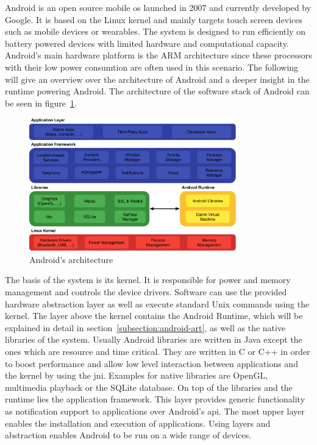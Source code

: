 Android is an open source mobile \gls{os} launched in 2007 and currently developed by Google.
It is based on the Linux kernel and mainly targets touch screen devices such as mobile devices or wearables.
The system is designed to run efficiently on battery powered devices with limited hardware and computational capacity.
Android's main hardware platform is the ARM architecture since these processors with their low power consumtion are often used in this scenario.
The following will give an overview over the architecture of Android and a deeper insight in the runtime powering Android.
The architecture of the software stack of Android can be seen in figure~\ref{fig:androidArchitecture}.
\newline

\begin{figure}[h]
    \centering
    \includegraphics[width=0.8\textwidth]{data/stack.png}
    \caption{Android's architecture \cite{androidStack}}
    \label{fig:androidArchitecture}
\end{figure}

The basis of the system is its kernel.
It is responsible for power and memory management and controls the device drivers.
Software can use the provided hardware abstraction layer as well as execute standard Unix commands using the kernel.
\newline
The layer above the kernel contains the Android Runtime, which will be explained in detail in section~\ref{subsection:android-art}, as well as the native libraries of the system.
Usually Android libraries are written in Java except the ones which are resource and time critical.
They are written in C or C++ in order to boost performance and allow low level interaction between applications and the kernel by using the \gls{jni}.
Examples for native libraries are OpenGL, multimedia playback or the SQLite database.
\newline
On top of the libraries and the runtime lies the application framework.
This layer provides generic functionality as notification support to applications over Android's \gls{api}.
\newline
The most upper layer enables the installation and execution of applications.
\newline
Using layers and abstraction enables Android to be run on a wide range of devices.



